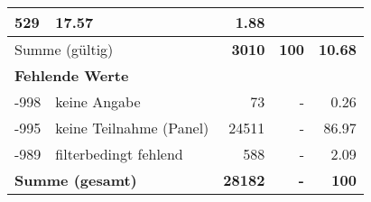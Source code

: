 \begin{longtable}{lXrrr}
       \num{529} &
       \num[round-mode=places,round-precision=2]{17.57} &
         \num[round-mode=places,round-precision=2]{1.88} \\
     \midrule
     \multicolumn{2}{l}{Summe (gültig)} &
       \textbf{\num{3010}} &
     \textbf{\num{100}} &
       \textbf{\num[round-mode=places,round-precision=2]{10.68}} \\
     \multicolumn{5}{l}{\textbf{Fehlende Werte}}\\
       -998 &
       keine Angabe &
         \num{73} &
        - &
         \num[round-mode=places,round-precision=2]{0.26} \\
       -995 &
       keine Teilnahme (Panel) &
         \num{24511} &
        - &
         \num[round-mode=places,round-precision=2]{86.97} \\
       -989 &
       filterbedingt fehlend &
         \num{588} &
        - &
         \num[round-mode=places,round-precision=2]{2.09} \\
     \midrule
     \multicolumn{2}{l}{\textbf{Summe (gesamt)}} &
          \textbf{\num{28182}} &
        \textbf{-} &
        \textbf{\num{100}} \\
     \bottomrule
     \end{longtable}
     
